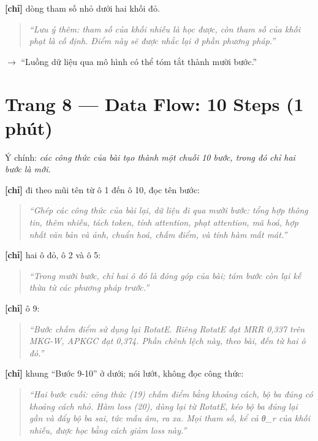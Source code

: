 \documentclass[11pt,a4paper]{article}
\begin{document}
\textbf{[chỉ]} dòng tham số nhỏ dưới hai khối đỏ.


\begin{quote}\itshape ``Lưu ý thêm: tham số của khối nhiễu là \emph{học được}, còn tham số của khối phạt là \emph{cố định}. Điểm này sẽ được nhắc lại ở phần phương pháp.''\end{quote}

\textbf{$\to$} ``Luồng dữ liệu qua mô hình có thể tóm tắt thành mười bước.''


\section*{Trang 8 --- Data Flow: 10 Steps (1 phút)}

Ý chính: \emph{các công thức của bài tạo thành một chuỗi 10 bước, trong đó chỉ hai bước là mới.}


\textbf{[chỉ]} đi theo mũi tên từ ô 1 đến ô 10, đọc tên bước:


\begin{quote}\itshape ``Ghép các công thức của bài lại, dữ liệu đi qua mười bước: tổng hợp thông tin, thêm nhiễu, tách token, tính attention, phạt attention, mã hoá, hợp nhất văn bản và ảnh, chuẩn hoá, chấm điểm, và tính hàm mất mát.''\end{quote}

\textbf{[chỉ]} hai ô đỏ, ô 2 và ô 5:


\begin{quote}\itshape ``Trong mười bước, chỉ hai ô đỏ là đóng góp của bài; tám bước còn lại kế thừa từ các phương pháp trước.''\end{quote}

\textbf{[chỉ]} ô 9:


\begin{quote}\itshape ``Bước chấm điểm sử dụng lại RotatE. Riêng RotatE đạt MRR 0,337 trên MKG-W, APKGC đạt 0,374. Phần chênh lệch này, theo bài, đến từ hai ô đỏ.''\end{quote}

\textbf{[chỉ]} khung ``Bước 9-10'' ở dưới; nói lướt, không đọc công thức:


\begin{quote}\itshape ``Hai bước cuối: công thức (19) chấm điểm bằng khoảng cách, bộ ba đúng có khoảng cách nhỏ. Hàm loss (20), dùng lại từ RotatE, kéo bộ ba đúng lại gần và đẩy bộ ba sai, tức mẫu âm, ra xa. Mọi tham số, kể cả θ\_r của khối nhiễu, được học bằng cách giảm loss này.''\end{quote}
\end{document}
